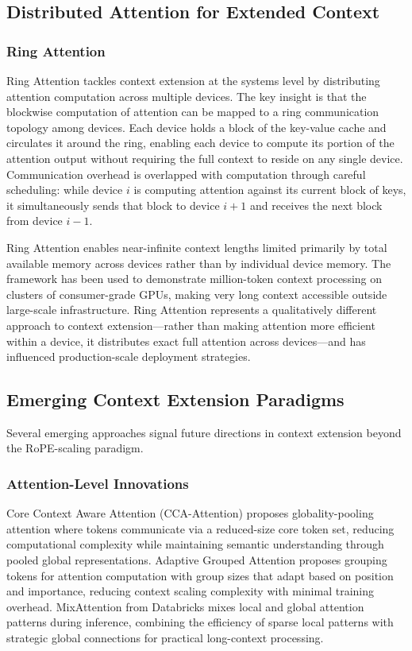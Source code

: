 \documentclass[11pt,letterpaper]{article}
\begin{document}
\subsection{Distributed Attention for Extended Context}

\subsubsection{Ring Attention}

Ring Attention \cite{liu2023ring} tackles context extension at the systems level by distributing attention computation across multiple devices. The key insight is that the blockwise computation of attention can be mapped to a ring communication topology among devices. Each device holds a block of the key-value cache and circulates it around the ring, enabling each device to compute its portion of the attention output without requiring the full context to reside on any single device. Communication overhead is overlapped with computation through careful scheduling: while device $i$ is computing attention against its current block of keys, it simultaneously sends that block to device $i+1$ and receives the next block from device $i-1$.

Ring Attention enables near-infinite context lengths limited primarily by total available memory across devices rather than by individual device memory. The framework has been used to demonstrate million-token context processing on clusters of consumer-grade GPUs, making very long context accessible outside large-scale infrastructure. Ring Attention represents a qualitatively different approach to context extension---rather than making attention more efficient within a device, it distributes exact full attention across devices---and has influenced production-scale deployment strategies.

\subsection{Emerging Context Extension Paradigms}

Several emerging approaches signal future directions in context extension beyond the RoPE-scaling paradigm.

\subsubsection{Attention-Level Innovations}

Core Context Aware Attention (CCA-Attention) proposes globality-pooling attention where tokens communicate via a reduced-size core token set, reducing computational complexity while maintaining semantic understanding through pooled global representations. Adaptive Grouped Attention proposes grouping tokens for attention computation with group sizes that adapt based on position and importance, reducing context scaling complexity with minimal training overhead. MixAttention from Databricks mixes local and global attention patterns during inference, combining the efficiency of sparse local patterns with strategic global connections for practical long-context processing.
\end{document}
